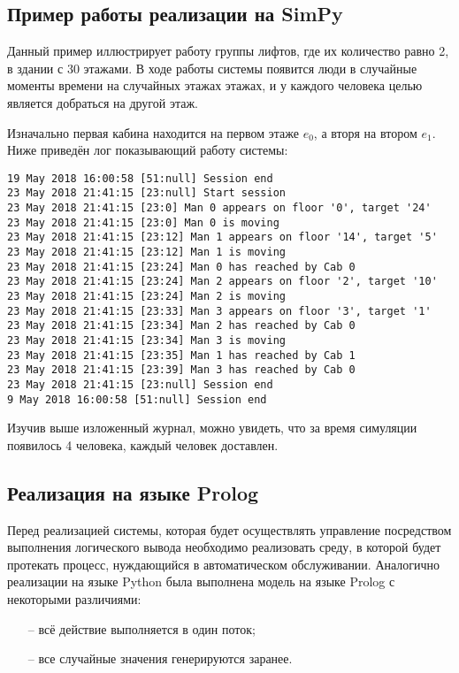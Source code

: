 	\subsection{Пример работы реализации на SimPy}

		Данный пример иллюстрирует работу группы лифтов, где их количество равно 2, в здании с 30 этажами.
			В ходе работы системы появится люди в случайные моменты времени на случайных этажах этажах,
			и у каждого человека целью является добраться на другой этаж.

		Изначально первая кабина находится на первом этаже $e_0$, а вторя на втором $e_1$.
			Ниже приведён лог показывающий работу системы:

\begin{lstlisting}
19 May 2018 16:00:58 [51:null] Session end
23 May 2018 21:41:15 [23:null] Start session
23 May 2018 21:41:15 [23:0] Man 0 appears on floor '0', target '24'
23 May 2018 21:41:15 [23:0] Man 0 is moving
23 May 2018 21:41:15 [23:12] Man 1 appears on floor '14', target '5'
23 May 2018 21:41:15 [23:12] Man 1 is moving
23 May 2018 21:41:15 [23:24] Man 0 has reached by Cab 0
23 May 2018 21:41:15 [23:24] Man 2 appears on floor '2', target '10'
23 May 2018 21:41:15 [23:24] Man 2 is moving
23 May 2018 21:41:15 [23:33] Man 3 appears on floor '3', target '1'
23 May 2018 21:41:15 [23:34] Man 2 has reached by Cab 0
23 May 2018 21:41:15 [23:34] Man 3 is moving
23 May 2018 21:41:15 [23:35] Man 1 has reached by Cab 1
23 May 2018 21:41:15 [23:39] Man 3 has reached by Cab 0
23 May 2018 21:41:15 [23:null] Session end
9 May 2018 16:00:58 [51:null] Session end
\end{lstlisting}

			Изучив выше изложенный журнал, можно увидеть, что за время симуляции появилось 4 человека,
				каждый человек доставлен.

	\subsection{Реализация на языке Prolog}

		Перед реализацией системы, которая будет осуществлять управление посредством выполнения логического вывода
			необходимо реализовать среду, в которой будет протекать процесс, нуждающийся в автоматическом обслуживании.
			Аналогично реализации на языке Python была выполнена модель на языке Prolog с некоторыми различиями:
		\begin{itemize}
			\item[--] всё действие выполняется в один поток;
			\item[--] все случайные значения генерируются заранее.
		\end{itemize}

